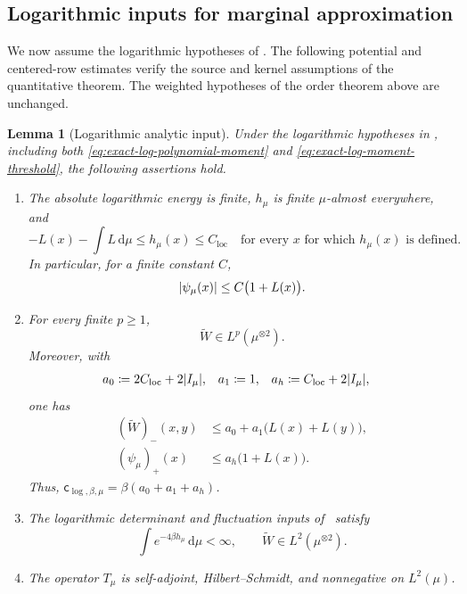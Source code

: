 \documentclass[11pt,reqno]{amsart}
\numberwithin{equation}{section}
\theoremstyle{plain}
\newtheorem{lemma}[lemma]{Lemma}
\theoremstyle{remark}
\DeclarePairedDelimiter{\abs}{\lvert}{\rvert}
\newcommand{\md}{\mathrm{d}}
\newcommand{\tl}{\widetilde}
\newcommand{\be}{\beta}
\begin{document}
\subsection{Logarithmic inputs for marginal approximation}
\label{subsubsec:log-quantitative-model-estimates}

We now assume the logarithmic hypotheses of .  The following potential and centered-row estimates verify the source and kernel assumptions of the quantitative theorem.  The weighted hypotheses of the order theorem above are unchanged.


\begin{lemma}[Logarithmic analytic input]\label{lem:exact-log-analytic}
Under the logarithmic hypotheses in , including both \eqref{eq:exact-log-polynomial-moment} and \eqref{eq:exact-log-moment-threshold}, the following assertions hold.

\begin{enumerate}[label=\textup{(\roman*)}]
\item The absolute logarithmic energy is finite, $h_\mu$ is finite $\mu$-almost everywhere, and
\begin{equation}\label{eq:exact-log-h-two-sided}
 -L(x)-\int L\,\md\mu
 \leq h_\mu(x)\leq C_{\mathrm{loc}}
 \quad\text{for every }x\text{ for which }h_\mu(x)\text{ is defined}.
\end{equation}
In particular, for a finite constant $C$,
\begin{equation}\label{eq:exact-log-psi-growth}
 \abs{\psi_\mu(x)}\leq C\bigl(1+L(x)\bigr).
\end{equation}
\item For every finite $p\geq1$,
\begin{equation}\label{eq:exact-log-w-Lp}
 \tl W\in L^p(\mu^{\otimes2}).
\end{equation}
Moreover, with
\begin{align}
 a_0&\coloneqq2C_{\mathrm{loc}}+2\abs{I_\mu},
 &a_1&\coloneqq1,
 &a_h&\coloneqq C_{\mathrm{loc}}+2\abs{I_\mu},
 \label{eq:exact-log-envelope-constants}
\end{align}
one has
\begin{align}
 (\tl W)_-(x,y)
 &\leq a_0+a_1\bigl(L(x)+L(y)\bigr),\label{eq:exact-log-w-negative-envelope}\\
 (\psi_\mu)_+(x)
 &\leq a_h\bigl(1+L(x)\bigr).
 \label{eq:exact-log-psi-positive-envelope}
\end{align}
Thus, $\mathsf c_{\log,\be,\mu}=\be(a_0+a_1+a_h)$.
\item The logarithmic determinant and fluctuation inputs of~\cite{DGR26} satisfy
\begin{equation}\label{eq:exact-log-DGR-log-inputs}
 \int e^{-4\be h_\mu}\,\md\mu<\infty,
 \qquad
 \tl W\in L^2(\mu^{\otimes2}).
\end{equation}
\item The operator $T_\mu$ is self-adjoint, Hilbert--Schmidt, and nonnegative on $L^2(\mu)$.
\end{enumerate}
\end{lemma}
\end{document}
